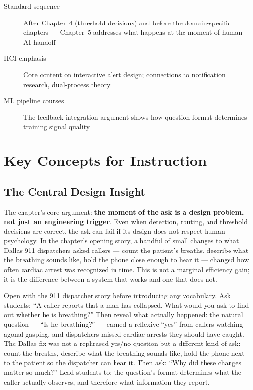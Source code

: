 \begin{description}
    \item[Standard sequence] After Chapter~4 (threshold decisions) and before the domain-specific chapters --- Chapter~5 addresses what happens at the moment of human-AI handoff
    \item[HCI emphasis] Core content on interactive alert design; connections to notification research, dual-process theory
    \item[ML pipeline courses] The feedback integration argument shows how question format determines training signal quality
\end{description}

\section{Key Concepts for Instruction}

\subsection{The Central Design Insight}

The chapter's core argument: \textbf{the moment of the ask is a design problem, not just an engineering trigger}. Even when detection, routing, and threshold decisions are correct, the ask can fail if its design does not respect human psychology. In the chapter's opening story, a handful of small changes to what Dallas 911 dispatchers asked callers --- count the patient's breaths, describe what the breathing sounds like, hold the phone close enough to hear it --- changed how often cardiac arrest was recognized in time. This is not a marginal efficiency gain; it is the difference between a system that works and one that does not.

\begin{technote}
Open with the 911 dispatcher story before introducing any vocabulary. Ask students: ``A caller reports that a man has collapsed. What would you ask to find out whether he is breathing?'' Then reveal what actually happened: the natural question --- ``Is he breathing?'' --- earned a reflexive ``yes'' from callers watching agonal gasping, and dispatchers missed cardiac arrests they should have caught. The Dallas fix was not a rephrased yes/no question but a different kind of ask: count the breaths, describe what the breathing sounds like, hold the phone next to the patient so the dispatcher can hear it. Then ask: ``Why did these changes matter so much?'' Lead students to: the question's format determines what the caller actually observes, and therefore what information they report.
\end{technote}

